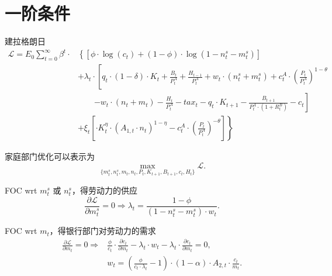 \section{一阶条件}
建拉格朗日
\begin{equation}
\label{eq:hh-optimal-lagrangian}
\begin{split}
\mathcal{L} = E_0 \sum_{t=0}^{\infty} \beta^t \cdot & \left\{
\left[
  \phi \cdot \log (c_t) + (1-\phi) \cdot \log \left(1-n_t^s - m_t^s\right)
\right] \right.\\
&\left.  + \lambda_t \cdot  \left[ q_t \cdot (1-\delta) \cdot K_t + \frac{B_t}{P_t^A} + \frac{H_{t-1}}{P_t^A} + w_t \cdot \left( n_t^s + m_t^s \right) + c_t^A \cdot \left(\frac{P_t}{P_t^A}\right)^{1-\theta} \right. \right.\\
&\left. \qquad \left.  - w_t \cdot \left( n_t + m_t \right) - \frac{H_t}{P_t^A} - tax_t - q_t \cdot K_{t+1} - \frac{B_{t+1}}{P_t^A \cdot \left(1 + R_t^B\right)}  - c_t \right] \right.\\
& \left. +\xi_t \left[ \cdot K_t^{\eta} \cdot \left(A_{1,t} \cdot n_t \right)^{1-\eta} -  c_t^A \cdot \left(\frac{P_t}{P_t^A}\right)^{-\theta} \right] \right\}
\end{split}
\end{equation}

家庭部门优化可以表示为
\begin{equation*}
\max_{\{m_t^s, n_t^s, m_t, n_t, P_{t}, K_{t+1}, B_{t+1}, c_t, H_t\}} \mathcal{L}.
\end{equation*}

FOC wrt $m_t^s$ 或 $n_t^s$，得劳动力的供应
\begin{equation}
\label{hh-opt-wrt-ms}
\frac{\partial{\mathcal{L}}}{\partial{m_t^s}} = 0 \Rightarrow \lambda_t = \frac{1-\phi}{\left(1-n_t^s - m_t^s \right) \cdot w_t}.
\end{equation}

FOC wrt $m_t$，得银行部门对劳动力的需求
\begin{equation}
\label{hh-opt-wrt-m}
\begin{split}
\frac{\partial{\mathcal{L}}}{\partial{m_t}} = 0 \Rightarrow
&\frac{\phi}{c_t} \cdot \frac{\partial c_t}{\partial m_t} - \lambda_t \cdot w_t - \lambda_t \cdot \frac{\partial c_t}{\partial m_t} = 0, \\
&w_t = \left(\frac{\phi}{c_t \cdot \lambda_t} - 1 \right) \cdot \left(1-\alpha\right) \cdot A_{2,t} \cdot \frac{c_t}{m_t}.
\end{split}
\end{equation}

